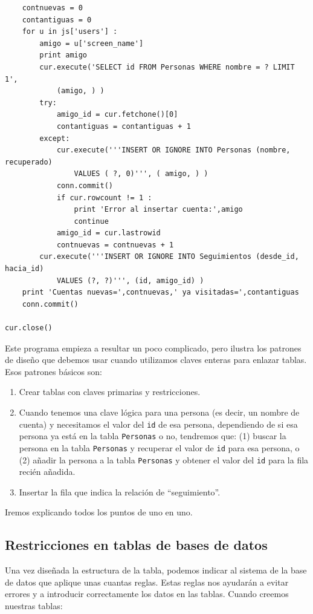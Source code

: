 \begin{verbatim}
    contnuevas = 0
    contantiguas = 0
    for u in js['users'] :
        amigo = u['screen_name']
        print amigo
        cur.execute('SELECT id FROM Personas WHERE nombre = ? LIMIT 1', 
            (amigo, ) )
        try:
            amigo_id = cur.fetchone()[0]
            contantiguas = contantiguas + 1
        except:
            cur.execute('''INSERT OR IGNORE INTO Personas (nombre, recuperado) 
                VALUES ( ?, 0)''', ( amigo, ) )
            conn.commit()
            if cur.rowcount != 1 :
                print 'Error al insertar cuenta:',amigo
                continue
            amigo_id = cur.lastrowid
            contnuevas = contnuevas + 1
        cur.execute('''INSERT OR IGNORE INTO Seguimientos (desde_id, hacia_id) 
            VALUES (?, ?)''', (id, amigo_id) )
    print 'Cuentas nuevas=',contnuevas,' ya visitadas=',contantiguas
    conn.commit()

cur.close()
\end{verbatim}
\afterverb
%
Este programa empieza a resultar un poco complicado, pero ilustra
los patrones de diseño que debemos usar cuando utilizamos
claves enteras para enlazar tablas. Esos patrones básicos son:

\begin{enumerate}

\item Crear tablas con claves primarias y restricciones.

\item Cuando tenemos una clave lógica para una persona (es decir, un
nombre de cuenta) y necesitamos el valor del {\tt id} de esa persona,
dependiendo de si esa persona ya está en la tabla
{\tt Personas} o no, tendremos que:
(1) buscar la persona en la tabla {\tt Personas} y
recuperar el valor de {\tt id} para esa persona,
o (2) añadir la persona a la tabla {\tt Personas} y obtener el
valor del {\tt id} para la fila recién añadida.

\item Insertar la fila que indica la relación de ``seguimiento''.

\end{enumerate}

Iremos explicando todos los puntos de uno en uno.

\subsection{Restricciones en tablas de bases de datos}

Una vez diseñada la estructura de la tabla, podemos indicar al sistema
de la base de datos que aplique unas cuantas reglas. Estas reglas nos
ayudarán a evitar errores y a introducir correctamente los datos en
las tablas. Cuando creemos nuestras tablas:

